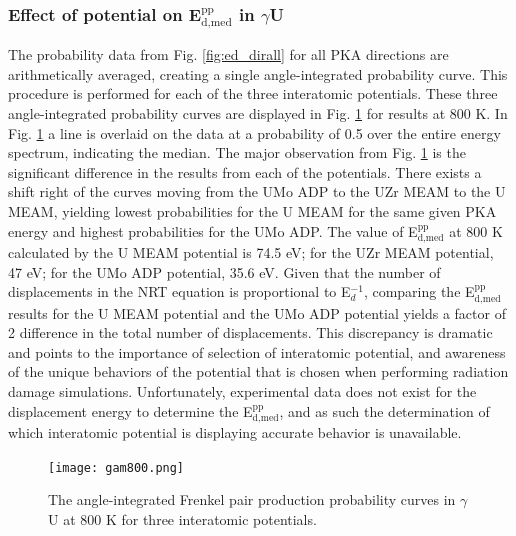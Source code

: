 \documentclass[review]{elsarticle}
\begin{document}
\FloatBarrier

\subsubsection{Effect of potential on E$^{\textrm{pp}}_{\textrm{d,med}}$ in $\gamma$U}

The probability data from Fig. \ref{fig:ed_dirall} for all PKA directions are arithmetically averaged, creating a single angle-integrated probability curve. This procedure is performed for each of the three interatomic potentials. These three angle-integrated probability curves are displayed in Fig. \ref{fig:gam800} for results at 800 K. In Fig. \ref{fig:gam800} a line is overlaid on the data at a probability of 0.5 over the entire energy spectrum, indicating the median. The major observation from Fig. \ref{fig:gam800} is the significant difference in the results from each of the potentials. There exists a shift right of the curves moving from the UMo ADP to the UZr MEAM to the U MEAM, yielding lowest probabilities for the U MEAM for the same given PKA energy and highest probabilities for the UMo ADP. The value of E$^{\textrm{pp}}_{\textrm{d,med}}$ at 800 K calculated by the U MEAM potential is 74.5 eV; for the UZr MEAM potential, 47 eV; for the UMo ADP potential, 35.6 eV. Given that the number of displacements in the NRT equation \cite{norgett1975} is proportional to E$_{d}^{-1}$, comparing the E$^{\textrm{pp}}_{\textrm{d,med}}$ results for the U MEAM potential and the UMo ADP potential yields a factor of 2 difference in the total number of displacements. This discrepancy is dramatic and points to the importance of selection of interatomic potential, and awareness of the unique behaviors of the potential that is chosen when performing radiation damage simulations. Unfortunately, experimental data does not exist for the displacement energy to determine the E$^{\textrm{pp}}_{\textrm{d,med}}$, and as such the determination of which interatomic potential is displaying accurate behavior is unavailable. 

\begin{figure}[h]
 \centering
 \texttt{[image: gam800.png]} 
 \caption{The angle-integrated Frenkel pair production probability curves in $\gamma$U at 800 K for three interatomic potentials.}
 \label{fig:gam800}
\end{figure}



\FloatBarrier
\end{document}
